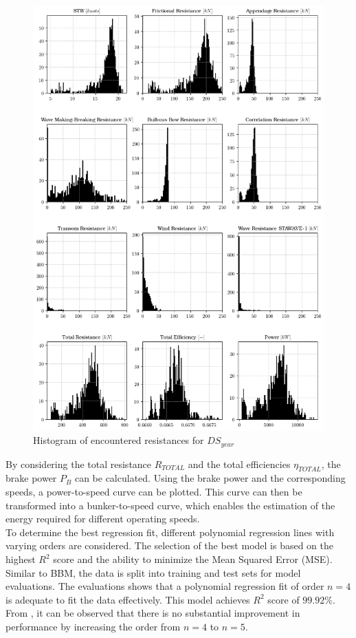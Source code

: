 \begin{figure}[h!]
    \centering
    \includegraphics[width=.9\linewidth]{02_figures/resistance_power_hist.png}
    \caption{Histogram of encountered resistances for $DS_{year}$}
    \label{fig:hist_resistance_power_yr}
\end{figure}

By considering the total resistance $R_{TOTAL}$ and the total efficiencies $\eta_{TOTAL}$, the brake power $P_B$ can be calculated. Using the brake power and the corresponding speeds, a power-to-speed curve can be plotted. This curve can then be transformed into a bunker-to-speed curve, which enables the estimation of the energy required for different operating speeds.\\ 

To determine the best regression fit, different polynomial regression lines with varying orders are considered. The selection of the best model is based on the highest $R^2$ score and the ability to minimize the Mean Squared Error (MSE). Similar to BBM, the data is split into training and test sets for model evaluations. The evaluations shows that a polynomial regression fit of order $n=4$ is adequate to fit the data effectively. This model achieves $R^2$ score of $99.92\%$. From , it can be observed that there is no substantial improvement in performance by increasing the order from $n=4$ to $n=5$.\\

